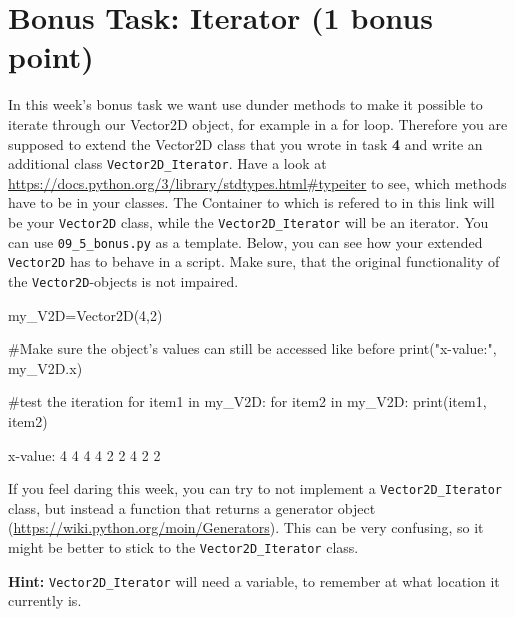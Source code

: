 
\section{Bonus Task: Iterator (1 bonus point)}

In this week's bonus task we want use dunder methods to make it possible to iterate through our Vector2D object, for example in a for loop. Therefore you are supposed to  extend the Vector2D class that you wrote in task \textbf{4} and write an additional class \texttt{Vector2D\_Iterator}. Have a look at\\ \href{https://docs.python.org/3/library/stdtypes.html\#typeiter}{https://docs.python.org/3/library/stdtypes.html\#typeiter} to see, which methods have to be in your classes. The Container to which is refered to in this link will be your \texttt{Vector2D} class, while the \texttt{Vector2D\_Iterator} will be an iterator. You can use \texttt{09\_5\_bonus.py} as a template. Below, you can see how your extended \texttt{Vector2D} has to behave in a script. Make sure, that the original functionality of the \texttt{Vector2D}-objects is not impaired.

\begin{pythoncode}

my_V2D=Vector2D(4,2)

#Make sure the object's values can still be accessed like before
print("x-value:", my_V2D.x)

#test the iteration
for item1 in my_V2D:
    for item2 in my_V2D:
        print(item1, item2)
\end{pythoncode}

\begin{outputcode}
x-value: 4
4 4
4 2
2 4
2 2
\end{outputcode}

\noindent If you feel daring this week, you can try to not implement a \texttt{Vector2D\_Iterator} class, but instead a function that returns a generator object (\href{https://wiki.python.org/moin/Generators}{https://wiki.python.org/moin/Generators}). This can be very confusing, so it might be better to stick to the \texttt{Vector2D\_Iterator} class.
\vspace{1em}

\noindent \textbf{Hint:} \texttt{Vector2D\_Iterator} will need a variable, to remember at what location it currently is.

